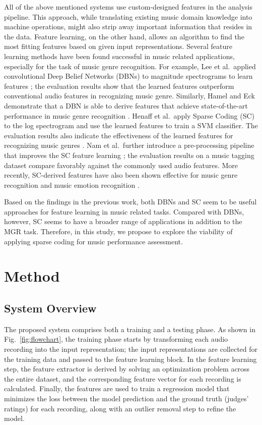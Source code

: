 \documentclass[conference]{IEEEtran}
\begin{document}
All of the above mentioned systems use custom-designed features in the analysis pipeline. This approach, while translating existing music domain knowledge into machine operations, might also strip away important information that resides in the data. Feature learning, on the other hand, allows an algorithm to find the most fitting features based on given input representations. Several feature learning methods have been found successful in music related applications, especially for the task of music genre recognition. For example, Lee et al.\  applied convolutional Deep Belief Networks (DBNs) to magnitude spectrograms to learn features \cite{Lee2009a}; the evaluation results show that the learned features outperform conventional audio features in recognizing music genre. 
Similarly, Hamel and Eck demonstrate that a DBN is able to derive features that achieve state-of-the-art performance in music genre recognition \cite{Hamel2010}. 
Henaff et al.\  apply Sparse Coding (SC) to the log spectrogram and use the learned features to train a SVM classifier. The evaluation results also indicate the effectiveness of the learned features for recognizing music genres \cite{Henaff2011}. 
Nam et al.\  further introduce a pre-processing pipeline that improves the SC feature learning \cite{Nam2012}; the evaluation results on a music tagging dataset compare favorably against the commonly used audio features. More recently, SC-derived features have also been shown effective for music genre recognition \cite{Hsu2016} and music emotion recognition \cite{OBrien2015}. 

Based on the findings in the previous work, both DBNs and SC seem to be useful approaches for feature learning in music related tasks. Compared with DBNs, however, SC seems to have a broader range of applications in addition to the MGR task. Therefore, in this study, we propose to explore the viability of applying sparse coding for music performance assessment.

\section{Method}\label{sec:method}
\subsection{System Overview}
The proposed system comprises both a training and a testing phase. As shown in Fig.~\ref{fig:flowchart}, the training phase starts by transforming each audio recording into the input representation; the input representations are collected for the training data and passed to the feature learning block. In the feature learning step, the feature extractor is derived by solving an optimization problem across the entire dataset, and the corresponding feature vector for each recording is calculated. Finally, the features are used to train a regression model that minimizes the loss between the model prediction and the ground truth (judges' ratings) for each recording, along with an outlier removal step to refine the model. 
\end{document}
